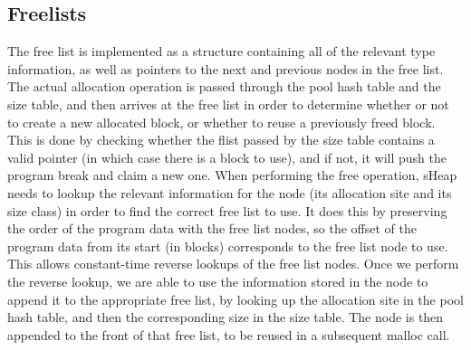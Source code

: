 \documentclass[conference]{IEEEtran}
\begin{document}
\subsection{Freelists}
The free list is implemented as a structure containing all of the relevant type 
information, as well as pointers to the next and previous nodes in the free list. 
The actual allocation operation is passed through the pool hash table and the size 
table, and then arrives at the free list in order to determine whether or not to 
create a new allocated block, or whether to reuse a previously freed block. This 
is done by checking whether the flist passed by the size table contains a valid 
pointer (in which case there is a block to use), and if not, it will push the 
program break and claim a new one. When performing the free operation, sHeap needs 
to lookup the relevant information for the node (its allocation site and its size 
class) in order to find the correct free list to use. It does this by preserving 
the order of the program data with the free list nodes, so the offset of the 
program data from its start (in blocks) corresponds to the free list node to use. 
This allows constant-time reverse lookups of the free list nodes. Once we perform 
the reverse lookup, we are able to use the information stored in the node to 
append it to the appropriate free list, by looking up the allocation site in the 
pool hash table, and then the corresponding size in the size table. The node is 
then appended to the front of that free list, to be reused in a subsequent malloc 
call.
\end{document}
